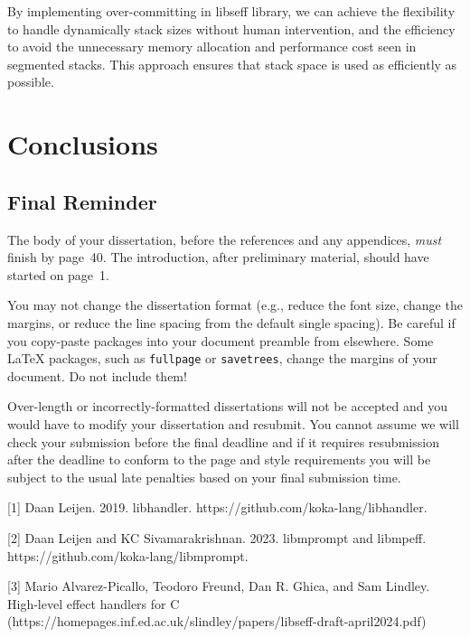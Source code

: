 \documentclass[logo,bsc,singlespacing,parskip]{infthesis}
\begin{document}
\medskip

By implementing over-committing in libseff library, we can achieve the flexibility to handle dynamically stack sizes without human intervention, and the efficiency to avoid the unnecessary memory allocation and performance cost seen in segmented stacks. This approach ensures that stack space is used as efficiently as possible.







\clearpage

\chapter{Conclusions}

\section{Final Reminder}

The body of your dissertation, before the references and any appendices,
\emph{must} finish by page~40. The introduction, after preliminary material,
should have started on page~1.

You may not change the dissertation format (e.g., reduce the font size, change
the margins, or reduce the line spacing from the default single spacing). Be
careful if you copy-paste packages into your document preamble from elsewhere.
Some \LaTeX{} packages, such as \texttt{fullpage} or \texttt{savetrees}, change
the margins of your document. Do not include them!

Over-length or incorrectly-formatted dissertations will not be accepted and you
would have to modify your dissertation and resubmit. You cannot assume we will
check your submission before the final deadline and if it requires resubmission
after the deadline to conform to the page and style requirements you will be
subject to the usual late penalties based on your final submission time.

% 


[1] Daan Leijen. 2019. libhandler. https://github.com/koka-lang/libhandler.

[2] Daan Leijen and KC Sivamarakrishnan. 2023. libmprompt and libmpeff. https://github.com/koka-lang/libmprompt.

[3] Mario Alvarez-Picallo, Teodoro Freund, Dan R. Ghica, and Sam Lindley. High-level effect handlers for C (https://homepages.inf.ed.ac.uk/slindley/papers/libseff-draft-april2024.pdf)
\end{document}
